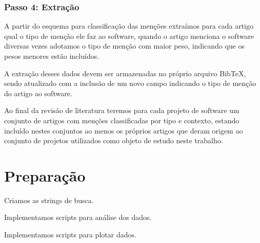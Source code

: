 

\subsubsection{Passo 4: Extração}

A partir do esquema para classificação das menções extraímos para cada artigo
qual o tipo de menção ele faz ao software, quando o artigo menciona o software
diversas vezes adotamos o tipo de menção com maior peso, indicando que os pesos
menores estão incluídos.


A extração desses dados devem ser armazenadas no próprio arquivo BibTeX, sendo
atualizado com a inclusão de um novo campo indicando o tipo de menção do artigo
ao software.

Ao final da revisão de literatura teremos para cada projeto de software um
conjunto de artigos com menções classificadas por tipo e contexto, estando
incluído nestes conjuntos ao menos os próprios artigos que deram origem ao
conjunto de projetos utilizados como objeto de estudo neste trabalho.



\section{Preparação} \label{estudo2:preparacao} %

Criamos as strings de busca.

Implementamos scripts para análise dos dados.

Implementamos scripts para plotar dados.

